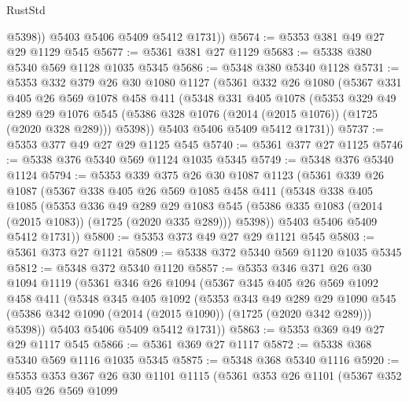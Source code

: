 \begin{lexlean}{RustStd}
\begin{coremodule}
{\begin{coremodule}
{{{{{{{{{{{{{            @5398))
        @5403
        @5406
        @5409
        @5412
        @1731))
@5674 := @5353 @381 @49 @27 @29 @1129 @545
@5677 := @5361 @381 @27 @1129
@5683 := @5338 @380 @5340 @569 @1128 @1035 @5345
@5686 := @5348 @380 @5340 @1128
@5731 := @5353
    @332
    @379
    @26
    @30
    @1080
    @1127
    (@5361
      @332
      @26
      @1080
      (@5367
        @331
        @405
        @26
        @569
        @1078
        @458
        @411
        (@5348
          @331
          @405
          @1078
          (@5353
            @329
            @49
            @289
            @29
            @1076
            @545
            (@5386 @328 @1076 (@2014 (@2015 @1076)) (@1725 (@2020 @328 @289)))
            @5398))
        @5403
        @5406
        @5409
        @5412
        @1731))
@5737 := @5353 @377 @49 @27 @29 @1125 @545
@5740 := @5361 @377 @27 @1125
@5746 := @5338 @376 @5340 @569 @1124 @1035 @5345
@5749 := @5348 @376 @5340 @1124
@5794 := @5353
    @339
    @375
    @26
    @30
    @1087
    @1123
    (@5361
      @339
      @26
      @1087
      (@5367
        @338
        @405
        @26
        @569
        @1085
        @458
        @411
        (@5348
          @338
          @405
          @1085
          (@5353
            @336
            @49
            @289
            @29
            @1083
            @545
            (@5386 @335 @1083 (@2014 (@2015 @1083)) (@1725 (@2020 @335 @289)))
            @5398))
        @5403
        @5406
        @5409
        @5412
        @1731))
@5800 := @5353 @373 @49 @27 @29 @1121 @545
@5803 := @5361 @373 @27 @1121
@5809 := @5338 @372 @5340 @569 @1120 @1035 @5345
@5812 := @5348 @372 @5340 @1120
@5857 := @5353
    @346
    @371
    @26
    @30
    @1094
    @1119
    (@5361
      @346
      @26
      @1094
      (@5367
        @345
        @405
        @26
        @569
        @1092
        @458
        @411
        (@5348
          @345
          @405
          @1092
          (@5353
            @343
            @49
            @289
            @29
            @1090
            @545
            (@5386 @342 @1090 (@2014 (@2015 @1090)) (@1725 (@2020 @342 @289)))
            @5398))
        @5403
        @5406
        @5409
        @5412
        @1731))
@5863 := @5353 @369 @49 @27 @29 @1117 @545
@5866 := @5361 @369 @27 @1117
@5872 := @5338 @368 @5340 @569 @1116 @1035 @5345
@5875 := @5348 @368 @5340 @1116
@5920 := @5353
    @353
    @367
    @26
    @30
    @1101
    @1115
    (@5361
      @353
      @26
      @1101
      (@5367
        @352
        @405
        @26
        @569
        @1099
}}}}}}}}}}}}}
\end{coremodule}}
\end{coremodule}
\end{lexlean}
